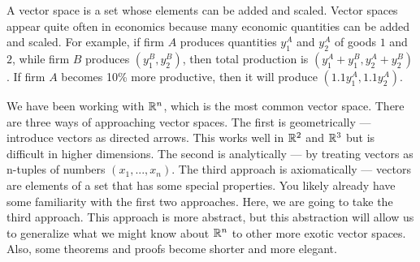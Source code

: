 A vector space is a set whose elements can be added and scaled. Vector
spaces appear quite often in economics because many economic
quantities can be added and scaled. For example, if firm $A$ produces
quantities $y_1^A$ and $y_2^A$ of goods $1$ and $2$, while firm $B$
produces $(y_1^B,y_2^B)$, then total production is $(y_1^A+y_1^B,
y_2^A+y_2^B)$. If firm $A$ becomes 10\% more productive, then it will
produce $(1.1 y_1^A, 1.1 y_2^A)$.

We have been working with $\mathbb{R}^n$, which is the most common vector
space. There are three ways of approaching vector spaces. The first is
geometrically --- introduce vectors as directed arrows. This works
well in $\mathbb{R}^2$ and $\mathbb{R}^3$ but is difficult in higher dimensions.  The
second is analytically --- by treating vectors as n-tuples of numbers
$(x_1, ..., x_n)$. The third approach is axiomatically --- vectors are
elements of a set that has some special properties. You likely already
have some familiarity with the first two approaches. Here, we are
going to take the third approach. This approach is more abstract, but
this abstraction will allow us to generalize what we might know about
$\mathbb{R}^n$ to other more exotic vector spaces. Also, some theorems and
proofs become shorter and more elegant.

